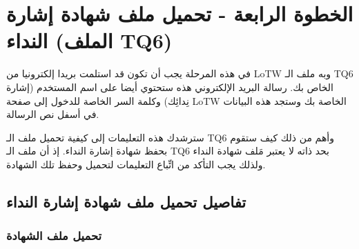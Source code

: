 \documentclass[a4paper,12pt]{article}
\begin{document}
\vspace{24pt}
\begin{center}
	\color{slategray2}
{\Huge\hrulefill\hspace{0.2cm} \floweroneright\floweroneleft \hspace{0.2cm} \hrulefill}
\end{center}
\newpage

\section{الخطوة الرابعة - تحميل ملف شهادة إشارة النداء (الملف \textenglish{TQ6})}

في هذه المرحلة يجب أن تكون قد استلمت بريدا إلكترونيا من \textenglish{LoTW} وبه ملف الـ
\textenglish{TQ6} الخاص بك. رسالة البريد الإلكتروني هذه ستحتوي أيضا على اسم المستخدم
(إشارة نِدائِك) وكلمة السر الخاصة للدخول إلى صفحة \textenglish{LoTW} الخاصة بك وستجد هذه
البيانات في أسفل نص الرسالة.

سترشدك هذه التعليمات إلى كيفية تحميل ملف الـ \textenglish{TQ6} وأهم من ذلك كيف ستقوم
بحفظ شهادة إشارة النداء. إذ أن ملف الـ \textenglish{TQ6} بحد ذاته لا يعتبر مَلف
شهادة النداء ولذلك يجب التأكد من اتِّباع التعليمات لتحميل وحفظ تلك
الشهادة.

\vspace{18pt}
\begin{center}
	\color{slategray2}
{\Huge \decoone}
\end{center}

\subsection{تفاصيل تحميل ملف شهادة إشارة النداء}

\subsubsection{تحميل ملف الشهادة}
\end{document}
